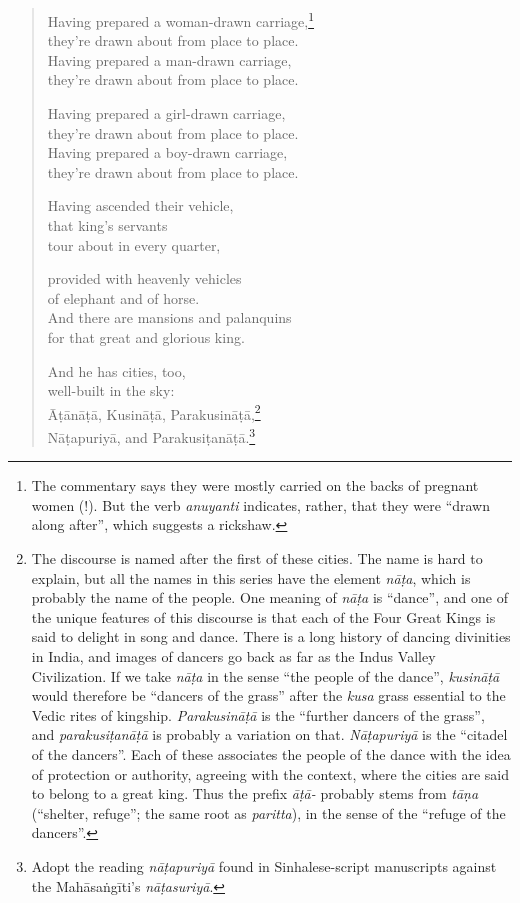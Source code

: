 \documentclass[12pt,openany]{book}%
\begin{document}
\begin{verse}
Having prepared a woman-drawn carriage,\footnote{The commentary says they were mostly carried on the backs of pregnant women (!). But the verb \textit{anuyanti} indicates, rather, that they were “drawn along after”, which suggests a rickshaw. } \\
they’re drawn about from place to place. \\
Having prepared a man-drawn carriage, \\
they’re drawn about from place to place. 

Having prepared a girl-drawn carriage, \\
they’re drawn about from place to place. \\
Having prepared a boy-drawn carriage, \\
they’re drawn about from place to place. 

Having ascended their vehicle, \\
that king’s servants \\
tour about in every quarter, 

provided with heavenly vehicles \\
of elephant and of horse. \\
And there are mansions and palanquins \\
for that great and glorious king. 

And he has cities, too, \\
well-built in the sky: \\
\textsanskrit{Āṭānāṭā}, \textsanskrit{Kusināṭā}, \textsanskrit{Parakusināṭā},\footnote{The discourse is named after the first of these cities. The name is hard to explain, but all the names in this series have the element \textit{\textsanskrit{nāṭa}}, which is probably the name of the people. One meaning of \textit{\textsanskrit{nāṭa}} is “dance”, and one of the unique features of this discourse is that each of the Four Great Kings is said to delight in song and dance. There is a long history of dancing divinities in India, and images of dancers go back as far as the Indus Valley Civilization. If we take \textit{\textsanskrit{nāṭa}} in the sense “the people of the dance”, \textit{\textsanskrit{kusināṭā}} would therefore be “dancers of the grass” after the \textit{kusa} grass essential to the Vedic rites of kingship. \textit{\textsanskrit{Parakusināṭā}} is the “further dancers of the grass”, and \textit{\textsanskrit{parakusiṭanāṭā}} is probably a variation on that. \textit{\textsanskrit{Nāṭapuriyā}} is the “citadel of the dancers”. Each of these associates the people of the dance with the idea of protection or authority, agreeing with the context, where the cities are said to belong to a great king. Thus the prefix \textit{\textsanskrit{āṭā}-} probably stems from \textit{\textsanskrit{tāṇa}} (“shelter, refuge”; the same root as \textit{paritta}), in the sense of the “refuge of the dancers”. } \\
\textsanskrit{Nāṭapuriyā}, and \textsanskrit{Parakusiṭanāṭā}.\footnote{Adopt the reading \textit{\textsanskrit{nāṭapuriyā}} found in Sinhalese-script manuscripts against the \textsanskrit{Mahāsaṅgīti}’s \textit{\textsanskrit{nāṭasuriyā}}. } 


\end{verse}
\end{document}
